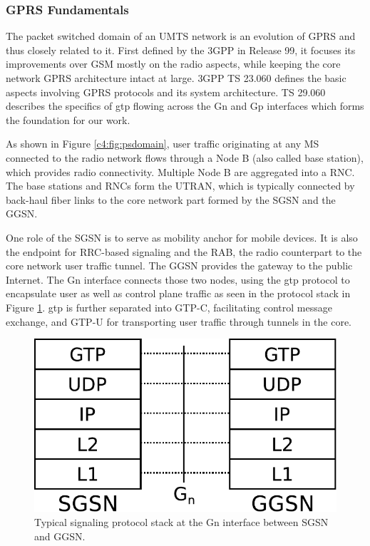 \subsubsection{\texorpdfstring{\acrshort{GPRS}}{GPRS} Fundamentals}

The packet switched domain of an \gls{UMTS} network is an evolution of \gls{GPRS} and thus closely related to it. First defined by the \gls{3GPP} in Release 99, it focuses its improvements over \gls{GSM} mostly on the radio aspects, while keeping the core network \gls{GPRS} architecture intact at large. \gls{3GPP} \gls{TS} 23.060 \cite{3gpp.23.060} defines the basic aspects involving \gls{GPRS} protocols and its system architecture. \gls{TS} 29.060 \cite{3gpp.29.060} describes the specifics of \gls{gtp} flowing across the Gn and Gp interfaces which forms the foundation for our work.



As shown in Figure \ref{c4:fig:psdomain}, user traffic originating at any \gls{MS} connected to the radio network flows through a Node B (also called base station), which provides radio connectivity. Multiple Node B are aggregated into a \gls{RNC}. The base stations and \glspl{RNC} form the \gls{UTRAN}, which is typically connected by back-haul fiber links to the core network part formed by the \gls{SGSN} and the \gls{GGSN}.

One role of the \gls{SGSN} is to serve as mobility anchor for mobile devices. It is also the endpoint for \gls{RRC}-based signaling and the \gls{RAB}, the radio counterpart to the core network user traffic tunnel. The \gls{GGSN} provides the gateway to the public Internet. The Gn interface connects those two nodes, using the \gls{gtp} protocol to encapsulate user as well as control plane traffic as seen in the protocol stack in Figure \ref{c4:fig:signallingstack}. \gls{gtp} is further separated into GTP-C, facilitating control message exchange, and GTP-U for transporting user traffic through tunnels in the core.

\begin{figure}[htb]
	\centering
	\includegraphics[width=0.6\columnwidth]{images/signalling-stack.pdf}
	\caption{Typical signaling protocol stack at the Gn interface between \gls{SGSN} and \gls{GGSN}.}
	\label{c4:fig:signallingstack}
\end{figure}


